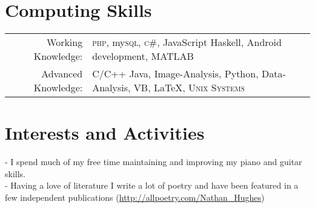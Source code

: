 \documentclass[a4paper,10pt]{article}
\begin{document}

\section{Computing Skills}
\begin{tabular}{rl}
  Working Knowledge:& \textsc{php}, my\textsc{sql}, \textsc{c\#}, JavaScript Haskell, Android development, MATLAB  \\
  Advanced Knowledge:& C/C++ Java, Image-Analysis, Python, Data-Analysis, VB, \LaTeX, \textsc{Unix Systems}
\end{tabular}

\section{Interests and Activities}                                                                               
- I spend much of my free time maintaining and improving my piano and guitar skills.\\                                     
- Having a love of literature I write a lot of poetry and have been featured in a few independent  publications (\href{http://allpoetry.com/Nathan\_Hughes}{http://allpoetry.com/Nathan\_Hughes})
\end{document}
